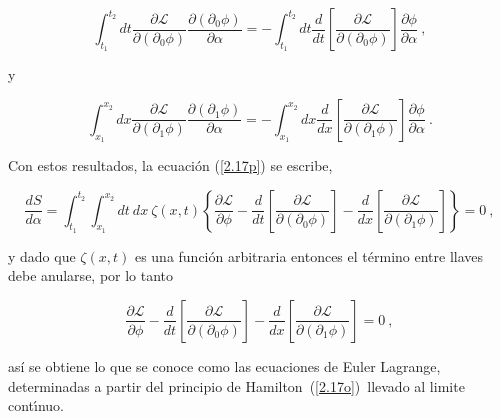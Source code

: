 \begin{equation}
\int_{t_{1}}^{t_{2}}dt\frac{\partial \mathcal{L}}{\partial \left( \partial_{0}\phi \right) }\frac{\partial \left( \partial _{0}\phi \right) }{\partial \alpha }=-\int_{t_{1}}^{t_{2}}dt\frac{d}{dt}\left[ \frac{\partial \mathcal{L}}{\partial \left( \partial _{0}\phi \right) }\right] \frac{\partial \phi }{\partial \alpha }~,
\label{2.17q}
\end{equation}

y

\begin{equation}
\int_{x_{1}}^{x_{2}}dx\frac{\partial \mathcal{L}}{\partial \left( \partial_{1}\phi \right) }\frac{\partial \left( \partial _{1}\phi \right) }{\partial \alpha }=-\int_{x_{1}}^{x_{2}}dx\frac{d}{dx}\left[ \frac{\partial \mathcal{L}}{\partial \left( \partial _{1}\phi \right) }\right] \frac{\partial \phi }{\partial \alpha }~.
\label{2.17r}
\end{equation}

Con estos resultados, la ecuación (\ref{2.17p}) se escribe,

\begin{equation*}
\frac{dS}{d\alpha }=\int_{t_{1}}^{t_{2}}\int_{x_{1}}^{x_{2}}dt\ dx\ \zeta \left( x,t\right) \left\{ \frac{\partial \mathcal{L}}{\partial \phi }-\frac{d}{dt}\left[ \frac{\partial \mathcal{L}}{\partial \left( \partial _{0}\phi \right) }\right] -\frac{d}{dx}\left[ \frac{\partial \mathcal{L}}{\partial \left( \partial _{1}\phi \right) }\right] \right\} =0~,
\end{equation*}

\noindent
y dado que $\zeta(x,t)$ es una función arbitraria entonces el término entre llaves debe anularse, por lo tanto

\begin{equation}
\boxed{
\frac{\partial \mathcal{L}}{\partial \phi }-\frac{d}{dt}\left[ \frac{\partial \mathcal{L}}{\partial \left( \partial _{0}\phi \right) }\right]-\frac{d}{dx}\left[ \frac{\partial \mathcal{L}}{\partial \left( \partial_{1}\phi \right) }\right] =0~,  \label{2.17s}
}
\end{equation}

\noindent
así se obtiene lo que se conoce como las ecuaciones de Euler Lagrange, determinadas a partir del principio de Hamilton\ (\ref{2.17o})\ llevado al limite cont\'{\i}nuo.\\


